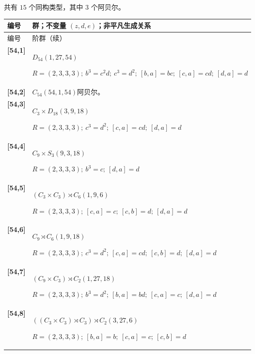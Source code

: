 \documentclass[UTF8,fontset=fandol,11pt,a4paper]{ctexart}
\begin{document}
共有 $15$ 个同构类型，其中 $3$ 个阿贝尔。

\begingroup\small\setlength{\tabcolsep}{3pt}\renewcommand{\arraystretch}{1.12}

\begin{longtable}{@{}p{17mm}>{\raggedright\arraybackslash}p{141mm}@{}}

\toprule 编号 & 群；不变量 $(z,d,e)$；非平凡生成关系\\\midrule\endfirsthead

\toprule 编号 & 54 阶群（续）\\\midrule\endhead\bottomrule\endfoot

\textbf{[54,1]} & $D_{54}$\quad $(1,27,54)$\par\(R=(2,3,3,3);\allowbreak\ b^{3}=c^{2}d;\allowbreak\ c^{3}=d^{2};\allowbreak\ [b,a]=bc;\allowbreak\ [c,a]=cd;\allowbreak\ [d,a]=d\)\\[3pt]

\textbf{[54,2]} & $C_{54}$\quad $(54,1,54)$\quad 阿贝尔。\\[3pt]

\textbf{[54,3]} & $C_{3}\times D_{18}$\quad $(3,9,18)$\par\(R=(2,3,3,3);\allowbreak\ c^{3}=d^{2};\allowbreak\ [c,a]=cd;\allowbreak\ [d,a]=d\)\\[3pt]

\textbf{[54,4]} & $C_{9}\times S_{3}$\quad $(9,3,18)$\par\(R=(2,3,3,3);\allowbreak\ b^{3}=c;\allowbreak\ [d,a]=d\)\\[3pt]

\textbf{[54,5]} & $(C_{3}\times C_{3})\rtimes C_{6}$\quad $(1,9,6)$\par\(R=(2,3,3,3);\allowbreak\ [c,a]=c;\allowbreak\ [c,b]=d;\allowbreak\ [d,a]=d\)\\[3pt]

\textbf{[54,6]} & $C_{9}\rtimes C_{6}$\quad $(1,9,18)$\par\(R=(2,3,3,3);\allowbreak\ c^{3}=d^{2};\allowbreak\ [c,a]=cd;\allowbreak\ [c,b]=d;\allowbreak\ [d,a]=d\)\\[3pt]

\textbf{[54,7]} & $(C_{9}\times C_{3})\rtimes C_{2}$\quad $(1,27,18)$\par\(R=(2,3,3,3);\allowbreak\ b^{3}=d^{2};\allowbreak\ [b,a]=bd;\allowbreak\ [c,a]=c;\allowbreak\ [d,a]=d\)\\[3pt]

\textbf{[54,8]} & $((C_{3}\times C_{3})\rtimes C_{3})\rtimes C_{2}$\quad $(3,27,6)$\par\(R=(2,3,3,3);\allowbreak\ [b,a]=b;\allowbreak\ [c,a]=c;\allowbreak\ [c,b]=d\)\\[3pt]


\end{longtable}
\end{document}
